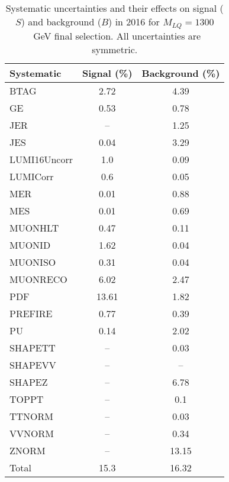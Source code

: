 \begin{table}[htbp]
\begin{center}
\caption{Systematic uncertainties and their effects on signal ($S$) and background ($B$) in 2016 for $M_{LQ}=1300$~GeV final selection. All uncertainties are symmetric.}
\begin{tabular}{lcc}
\hline\hline
Systematic & Signal (\%) & Background (\%) \\ \hline 
BTAG & 2.72 & 4.39\\ 
GE & 0.53 & 0.78\\ 
JER & -- & 1.25\\ 
JES & 0.04 & 3.29\\ 
LUMI16Uncorr & 1.0 & 0.09\\ 
LUMICorr & 0.6 & 0.05\\ 
MER & 0.01 & 0.88\\ 
MES & 0.01 & 0.69\\ 
MUONHLT & 0.47 & 0.11\\ 
MUONID & 1.62 & 0.04\\ 
MUONISO & 0.31 & 0.04\\ 
MUONRECO & 6.02 & 2.47\\ 
PDF & 13.61 & 1.82\\ 
PREFIRE & 0.77 & 0.39\\ 
PU & 0.14 & 2.02\\ 
SHAPETT & -- & 0.03\\ 
SHAPEVV & -- & --\\ 
SHAPEZ & -- & 6.78\\ 
TOPPT & -- & 0.1\\ 
TTNORM & -- & 0.03\\ 
VVNORM & -- & 0.34\\ 
ZNORM & -- & 13.15\\ 
Total & 15.3 & 16.32\\ \hline \hline
\end{tabular}
\label{tab:SysUncertainties_uujj_1300}
\end{center}
\end{table}

